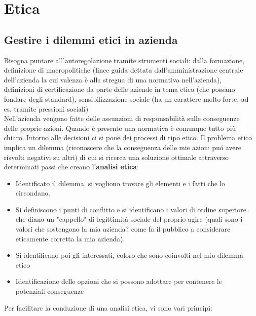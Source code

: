 \chapter{Etica}

\section{Gestire i dilemmi etici in azienda}
Bisogna puntare all'autoregolazione tramite strumenti sociali: dalla
formazione, definizione di macropolitiche (linee guida dettata
dall'amministrazione centrale dell'azienda la cui valenza \`e alla stregua
di una normativa nell'azienda), definizioni di certificazione da parte
delle aziende in tema etico (che possano fondare degli standard),
sensibilizzazione sociale (ha un carattere molto forte, ad es. tramite
pressioni sociali)\\
Nell'azienda vengono fatte delle assunzioni di responsabilit\`a sulle
conseguenze delle proprie azioni. Quando \`e presente una normativa \`e comunque 
tutto più chiaro. Intorno alle decisioni ci si pone dei
processi di tipo etico. Il problema etico implica un dilemma
(riconoscere che la conseguenza delle mie azioni pu\'o avere risvolti
negativi su altri) di cui si ricerca una soluzione ottimale attraverso
determinati passi che creano l'\textbf{analisi etica}:

\begin{itemize}

\item
  Identificato il dilemma, si vogliono trovare gli elementi e i fatti
  che lo circondano.\\
\item
  Si definiscono i punti di conflitto e si identificano i valori di
  ordine superiore che diano un "cappello" di legittimit\`a sociale del
  proprio agire (quali sono i valori che sostengono la mia azienda? come
  fa il pubblico a considerare eticamente corretta la mia azienda).\\
\item
  Si identificano poi gli interessati, coloro che sono coinvolti nel mio
  dilemma etico\\
\item
  Identificazione delle opzioni che si possono adottare per contenere le
  potenziali conseguenze
\end{itemize}

Per facilitare la conduzione di una analisi etica, vi sono vari
principi:

